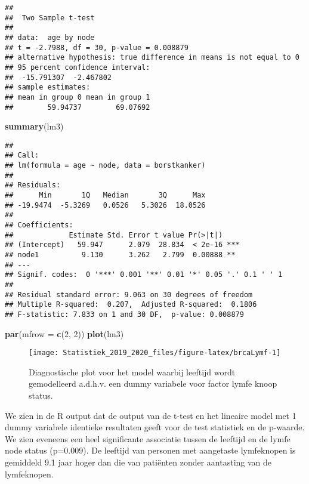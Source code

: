 \documentclass[12pt,dutch,coursenotes]{book}
\newenvironment{Shaded}{\begin{snugshade}}{\end{snugshade}}
\newcommand{\KeywordTok}[1]{\textcolor[rgb]{0.13,0.29,0.53}{\textbf{#1}}}
\newcommand{\DataTypeTok}[1]{\textcolor[rgb]{0.13,0.29,0.53}{#1}}
\newcommand{\DecValTok}[1]{\textcolor[rgb]{0.00,0.00,0.81}{#1}}
\newcommand{\NormalTok}[1]{#1}
\theoremstyle{definition}
\theoremstyle{definition}
\theoremstyle{definition}
\theoremstyle{remark}
\begin{document}
\begin{verbatim}
## 
##  Two Sample t-test
## 
## data:  age by node
## t = -2.7988, df = 30, p-value = 0.008879
## alternative hypothesis: true difference in means is not equal to 0
## 95 percent confidence interval:
##  -15.791307  -2.467802
## sample estimates:
## mean in group 0 mean in group 1 
##        59.94737        69.07692
\end{verbatim}

\begin{Shaded}
\begin{Highlighting}[]
\KeywordTok{summary}\NormalTok{(lm3)}
\end{Highlighting}
\end{Shaded}

\begin{verbatim}
## 
## Call:
## lm(formula = age ~ node, data = borstkanker)
## 
## Residuals:
##      Min       1Q   Median       3Q      Max 
## -19.9474  -5.3269   0.0526   5.3026  18.0526 
## 
## Coefficients:
##             Estimate Std. Error t value Pr(>|t|)    
## (Intercept)   59.947      2.079  28.834  < 2e-16 ***
## node1          9.130      3.262   2.799  0.00888 ** 
## ---
## Signif. codes:  0 '***' 0.001 '**' 0.01 '*' 0.05 '.' 0.1 ' ' 1
## 
## Residual standard error: 9.063 on 30 degrees of freedom
## Multiple R-squared:  0.207,  Adjusted R-squared:  0.1806 
## F-statistic: 7.833 on 1 and 30 DF,  p-value: 0.008879
\end{verbatim}

\begin{Shaded}
\begin{Highlighting}[]
\KeywordTok{par}\NormalTok{(}\DataTypeTok{mfrow =} \KeywordTok{c}\NormalTok{(}\DecValTok{2}\NormalTok{, }\DecValTok{2}\NormalTok{))}
\KeywordTok{plot}\NormalTok{(lm3)}
\end{Highlighting}
\end{Shaded}

\begin{figure}

{\centering \texttt{[image: Statistiek\_2019\_2020\_files/figure-latex/brcaLymf-1]} 

}

\caption{Diagnostische plot voor het model waarbij leeftijd wordt gemodelleerd a.d.h.v. een dummy variabele voor factor lymfe knoop status.}\label{fig:brcaLymf}
\end{figure}

We zien in de R output dat de output van de t-test en het lineaire model
met 1 dummy variabele identieke resultaten geeft voor de test statistiek
en de p-waarde. We zien eveneens een heel significante associatie tussen
de leeftijd en de lymfe node status (p=0.009). De leeftijd van personen
met aangetaste lymfeknopen is gemiddeld 9.1 jaar hoger dan die van
patiënten zonder aantasting van de lymfeknopen.
\end{document}
